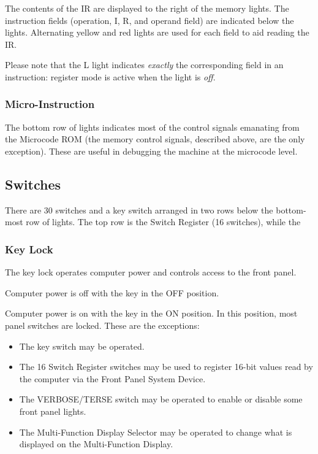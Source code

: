 \documentclass[11pt,a4paper,twocolumns]{article}
\newcommand{\lt}[1]{\textsf{#1}}
\newcommand{\sw}[1]{\textsf{#1}}
\newcommand\register[1]{\textsf{#1}}
\newcommand\IR{\register{IR}}
\begin{document}
The contents of the \IR{} are displayed to the right of the memory lights. The
instruction fields (operation, I, R, and operand field) are indicated below the
lights. Alternating yellow and red lights are used for each field to aid
reading the IR.

Please note that the \lt{L} light indicates {\em exactly\/} the corresponding
field in an instruction: register mode is active when the light is {\em off}.

\subsubsection{Micro-Instruction}

The bottom row of lights indicates most of the control signals emanating from
the Microcode ROM (the memory control signals, described above, are the only
exception). These are useful in debugging the machine at the microcode level.

\subsection{Switches}

There are 30 switches and a key switch arranged in two rows below the
bottom-most row of lights. The top row is the Switch Register (16
switches), while the 

\subsubsection{Key Lock}

The key lock operates computer power and controls access to the front
panel.

Computer power is off with the key in the \sw{OFF} position.

Computer power is on with the key in the \sw{ON} position. In this position,
most panel switches are locked. These are the exceptions:

\begin{itemize}
\item The key switch may be operated.
\item The 16 Switch Register switches may be used to register 16-bit values
  read by the computer via the Front Panel System Device.
\item The \sw{VERBOSE}/\sw{TERSE} switch may be operated to enable or disable
  some front panel lights.
\item The Multi-Function Display Selector may be operated to change what is
  displayed on the Multi-Function Display.
\end{itemize}
\end{document}
